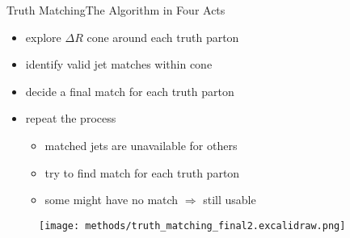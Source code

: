 \documentclass[9pt, aspectratio=169]{beamer}
\begin{document}
\addtocounter{framenumber}{-1} 

\begin{frame}{Truth Matching}{The Algorithm in Four Acts}
	\begin{minipage}{.60\textwidth}
		\begin{itemize}
			\item explore $\Delta R$ cone around each truth parton 
			\item identify valid jet matches within cone
			\item decide a final match for each truth parton 
			\item repeat the process
			\begin{itemize}
				\item matched jets are unavailable for others
				\item try to find match for each truth parton
				\item some might have no match $\Rightarrow$ still usable
			\end{itemize}
		\end{itemize}
	\end{minipage}\hfill
	\begin{minipage}{.38\textwidth}
		\begin{figure}
			\centering
			\texttt{[image: methods/truth\_matching\_final2.excalidraw.png]}
		\end{figure}
	\end{minipage}
\end{frame}
\end{document}
